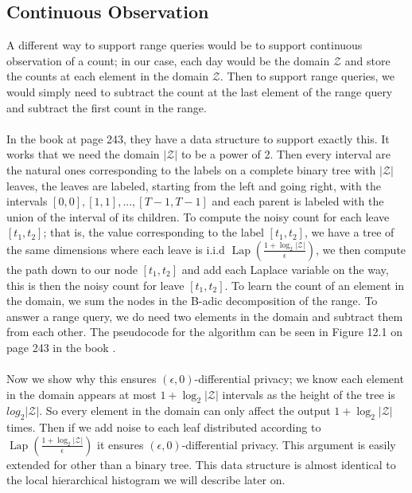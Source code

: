 \documentclass[11pt]{article}
\theoremstyle{definition}
\begin{document}
\subsection{Continuous Observation}
A different way to support range queries would be to support continuous observation of a count; in our case, each day would be the domain $\mathcal{Z}$ and store the counts at each element in the domain $\mathcal{Z}$. Then to support range queries, we would simply need to subtract the count at the last element of the range query and subtract the first count in the range. \\ \\
In the book \cite{algo_fun} at page 243, they have a data structure to support exactly this. It works that we need the domain $|\mathcal{Z}|$ to be a power of 2. Then every interval are the natural ones corresponding to the labels on a complete binary tree with $|\mathcal{Z}|$ leaves, the leaves are labeled, starting from the left and going right, with the intervals $[0,0],[1,1],...,[T-1, T-1]$ and each parent is labeled with the union of the interval of its children. To compute the noisy count for each leave $[t_1,t_2]$; that is, the value corresponding to the label $[t_1,t_2]$, we have a tree of the same dimensions where each leave is i.i.d $\operatorname{Lap}(\frac{1 + \log_2 |\mathcal{Z}|}{\epsilon})$, we then compute the path down to our node $[t_1,t_2]$ and add each Laplace variable on the way, this is then the noisy count for leave $[t_1,t_2]$. To learn the count of an element in the domain, we sum the nodes in the B-adic decomposition of the range. To answer a range query, we do need two elements in the domain and subtract them from each other. The pseudocode for the algorithm can be seen in Figure 12.1 on page 243 in the book \cite{algo_fun}. \\ \\
Now we show why this ensures $(\epsilon,0)$-differential privacy; we know each element in the domain appears at most $1 + \log_2 |\mathcal{Z}|$ intervals as the height of the tree is $log_2 |\mathcal{Z}|$. So every element in the domain can only affect the output $1 + \log_2 |\mathcal{Z}|$ times. Then if we add noise to each leaf distributed according to $\operatorname{Lap}(\frac{1 + \log_2 |\mathcal{Z}|}{\epsilon})$ it ensures $(\epsilon,0)$-differential privacy. This argument is easily extended for other than a binary tree. This data structure is almost identical to the local hierarchical histogram we will describe later on. \\
\end{document}
